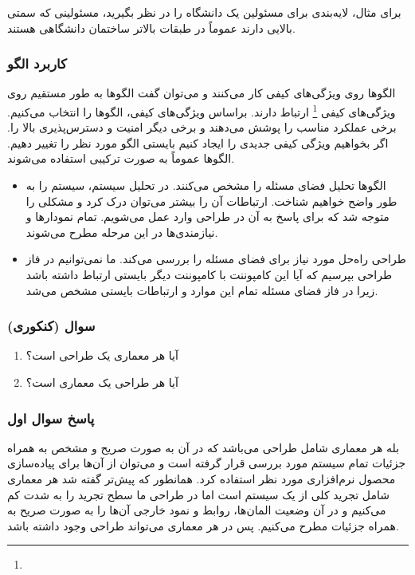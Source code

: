 \documentclass[a4paper]{article}
\begin{document}
برای مثال، لایه‌بندی برای مسئولین یک دانشگاه را در نظر بگیرید، مسئولینی که سمتی
بالایی دارند عموماً در طبقات بالاتر ساختمان دانشگاهی هستند.

\subsubsection{کاربرد الگو}

الگو‌ها روی ویژگی‌های کیفی کار می‌کنند و می‌توان گفت الگو‌ها به طور مستقیم روی
ویژگی‌های کیفی \footnote{} ارتباط دارند. براساس ویژگی‌های
کیفی، الگو‌ها را انتخاب می‌کنیم. برخی عملکرد مناسب را پوشش می‌دهند و برخی دیگر
امنیت و دسترس‌پذیری بالا را. اگر بخواهیم ویژگی کیفی جدیدی را ایجاد کنیم بایستی
الگو مورد نظر را تغییر دهیم. الگو‌ها عموماً به صورت ترکیبی استفاده می‌شوند.

\begin{itemize}
    \item الگو‌ها تحلیل فضای مسئله را مشخص می‌کنند. در تحلیل سیستم، سیستم را به
    طور واضح خواهیم شناخت. ارتباطات آن را بیشتر می‌توان درک کرد و مشکلی را متوجه
    شد که برای پاسخ به آن در طراحی وارد عمل می‌شویم. تمام نمودار‌ها و
    نیازمندی‌ها در این مرحله مطرح می‌شوند.
    \item طراحی راه‌حل مورد نیاز برای فضای مسئله را بررسی می‌کند. ما نمی‌توانیم
    در فاز طراحی بپرسیم که آیا این کامپوننت با کامپوننت دیگر بایستی ارتباط داشته
    باشد زیرا در فاز فضای مسئله تمام این موارد و ارتباطات بایستی مشخص می‌شد.
\end{itemize}

\subsubsection*{سوال (کنکوری)}

\begin{enumerate}
    \item آیا هر معماری یک طراحی است؟
    \item آیا هر طراحی یک معماری است؟
\end{enumerate}

\subsubsection*{پاسخ سوال اول}

بله هر معماری شامل طراحی می‌باشد که در آن به صورت صریح و مشخص به همراه جزئیات
تمام سیستم مورد بررسی قرار گرفته است و می‌توان از آن‌ها برای پیاده‌سازی محصول
نرم‌افزاری مورد نظر استفاده کرد. همانطور که پیش‌تر گفته شد هر معماری شامل تجرید
کلی از یک سیستم است اما در طراحی ما سطح تجرید را به شدت کم می‌کنیم و در آن وضعیت
المان‌ها، روابط و نمود خارجی آن‌ها را به صورت صریح به همراه جزئیات مطرح می‌کنیم.
پس در هر معماری می‌تواند طراحی وجود داشته باشد.
\end{document}
